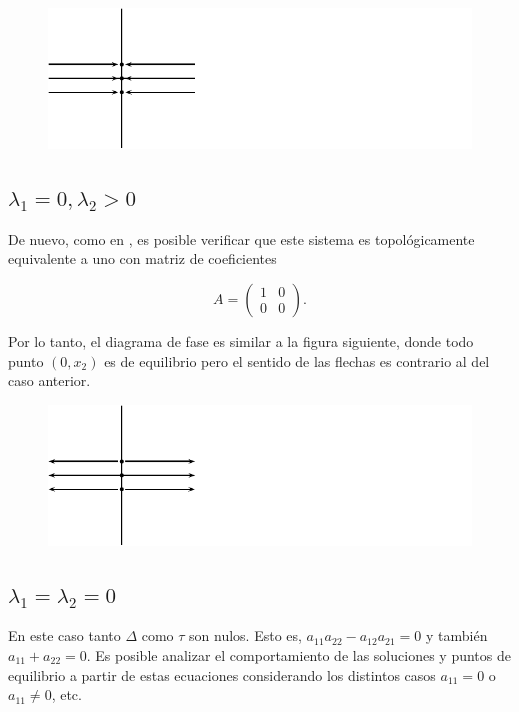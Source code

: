 \documentclass[11pt]{book}
\theoremstyle{definition}
\numberwithin{definition}{section}
\theoremstyle{theorem}
\numberwithin{theorem}{section}
\numberwithin{lemma}{section}
\numberwithin{corollary}{section}
\theoremstyle{plain}
\numberwithin{example}{section}
\begin{document}
\begin{figure}[!ht] \centering
    \includegraphics[scale=1.0]{figures/asingular_1.pdf}
\end{figure}

\subsection{$\lambda_1 = 0, \lambda_2 > 0$}
De nuevo, como en \cite[p.~239]{dynandbif}, es posible verificar que este sistema es topológicamente equivalente a uno con matriz de coeficientes

$$ A = \left( \begin{array}{ll} 1 & 0 \\ 0 & 0 \end{array} \right).$$

Por lo tanto, el diagrama de fase es similar a la figura siguiente, donde todo punto $(0,x_2)$ es de equilibrio pero el sentido de las flechas es contrario al del caso anterior.

\begin{figure}[!ht] \centering
    \includegraphics[scale=1.0]{figures/asingular1.pdf}
\end{figure}

\subsection{$\lambda_1 = \lambda_2 = 0$}
En este caso tanto $\Delta$ como $\tau$ son nulos. Esto es, $a_{11}a_{22} - a_{12}a_{21} = 0$ y también $a_{11} + a_{22} = 0$.
Es posible analizar el comportamiento de las soluciones y puntos de equilibrio a partir de estas ecuaciones considerando los distintos casos $a_{11} = 0$ o $a_{11} \neq 0$, etc.
\end{document}
